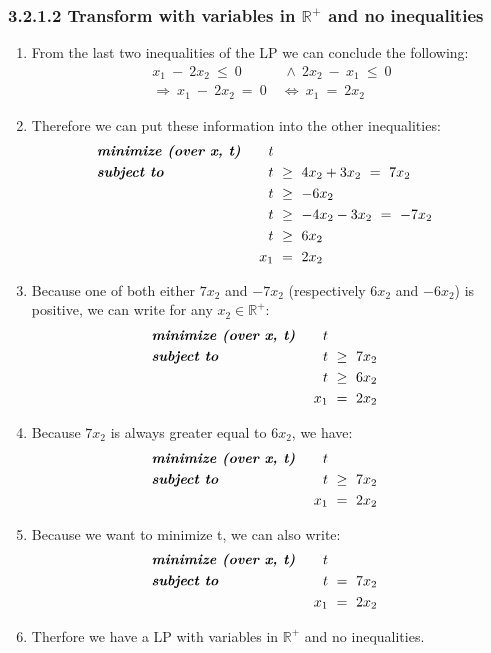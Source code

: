 \documentclass{report}
\begin{document}
	\subsubsection*{3.2.1.2 Transform with variables in $\mathbb{R}^+$ and no inequalities}
	\begin{enumerate}[]
		\item From the last two inequalities of the LP we can conclude the following:
		\begin{align*}
			x_1 \ - \ 2x_2 \ \leq \ 0 \ & \, \wedge \ 2x_2 \ - \ x_1 \ \leq \ 0 \\
			\Rightarrow \ x_1 \ - \ 2x_2 \ = \ 0 \ & \Leftrightarrow \ x_1 \ = \ 2x_2
		\end{align*}
		\item Therefore we can put these information into the other inequalities:
		\begin{align*}
			& \textit{\textbf{minimize (over x, t)}} & t \ \\
			& \textit{\textbf{subject to}} & \ t \ & \geq \ 4x_2 + 3x_2 \ = \ 7x_2 \\
			& & \ t \ & \geq \ -6x_2 \\
			& & \ t \ & \geq \ -4x_2-3x_2 \ = \ -7x_2 \\
			& & \ t \ & \geq \ 6x_2 \\
			& & \ x_1 \ & = \ 2x_2
		\end{align*}
		\item Because one of both either $7x_2$ and $-7x_2$ (respectively $6x_2$ and $-6x_2$) is positive, we can write for any $x_2 \in \mathbb{R}^+$:
		\begin{align*}
			& \textit{\textbf{minimize (over x, t)}} & t \ \\
			& \textit{\textbf{subject to}} & \ t \ & \geq \ 7x_2 \\
			& & \ t \ & \geq \ 6x_2 \\
			& & \ x_1 \ & = \ 2x_2
		\end{align*}
		\item Because $7x_2$ is always greater equal to $6x_2$, we have:
		\begin{align*}
			& \textit{\textbf{minimize (over x, t)}} & t \ \\
			& \textit{\textbf{subject to}} & \ t \ & \geq \ 7x_2 \\
			& & \ x_1 \ & = \ 2x_2
		\end{align*}
		\item Because we want to minimize t, we can also write:
		\begin{align*}
			& \textit{\textbf{minimize (over x, t)}} & t \ \\
			& \textit{\textbf{subject to}} & \ t \ & = \ 7x_2 \\
			& & \ x_1 \ & = \ 2x_2
		\end{align*}
		\item Therfore we have a LP with variables in $\mathbb{R}^+$ and no inequalities.
	\end{enumerate}
	\newpage
\end{document}
